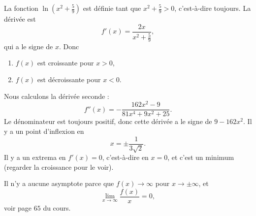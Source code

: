 \begin{corrige}{4}

La fonction  $\ln(x^2+\frac{ 5 }{ 9 })$ est définie tant que $x^2+\frac{ 5 }{ 9 }>0$, c'est-à-dire toujours. La dérivée est
\begin{equation}
	f'(x)=\frac{ 2x }{ x^2+\frac{ 5 }{ 9 } },
\end{equation}
qui a le signe de $x$. Donc
\begin{enumerate}

\item $f(x)$ est croissante pour $x>0$,
\item $f(x)$ est décroissante pour $x<0$.
\end{enumerate}

Nous calculons la dérivée seconde :
\begin{equation}
	f''(x)=-\frac{ 162 x^2 -9}{ 81x^4+9x^2+25 }.
\end{equation}
Le dénominateur est toujours positif, donc cette dérivée a le signe de $9-162 x^2$. Il y a un point d'inflexion en
\begin{equation}
	x=\pm\frac{ 1 }{ 3\sqrt{2} }.
\end{equation}
Il y a un extrema en $f'(x)=0$, c'est-à-dire en $x=0$, et c'est un minimum (regarder la croissance pour le voir).

Il n'y a aucune asymptote parce que $f(x)\to \infty$ pour $x\to\pm\infty$, et 
\begin{equation}
	\lim_{x\to\infty}\frac{ f(x) }{ x }=0,
\end{equation}
voir page $65$ du cours.

%

\end{corrige}
